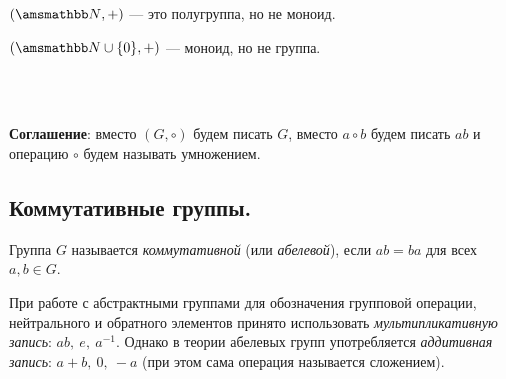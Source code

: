 \begin{example}
  $(\NN, +)$ --- это полугруппа, но не моноид.
  
  $(\NN \cup \{0\}, +)$ --- моноид, но не группа.
\end{example}
\\ \\
\begin{comment}
  \vspace{-0.3cm}
  \begin{enumerate}
    \item Ассоциативность довольно редкое свойство. \\
     Примеры неассоциативных бинарных операций:
     $M = \ZZ, a \circ b := a - b$ или 
     $M = \NN, a \circ b := a^b$.
    \item Нейтральный элемент в моноиде (и группе) единствен:
    если $e_1, e_2 \in M$ --- два нейтральных элемента, то
    $e_1 = e_1 \circ e_2 = e_2$.
    \item Обратный элемент в группе единствен:
    если $b_1, b_2$ --- два обратных к $a$ элемента, то
    \[
     b_1 = b_1 \circ e = b_1 \circ (a \circ b_2) =
     (b_1 \circ a) \circ b_2 = e \circ b_2 = b_2.
    \]
    Ввиду единственности обратный к $a$ элемент обозначается 
    символом $a^{-1}$.
    \item $(a \circ b)^{-1} = b^{-1} \circ a^{-1}$:
    \[
      (a \circ b) \circ (b^{-1} \circ a^{-1}) = 
      a \circ (b \circ b^{-1}) \circ a^{-1} = 
      a \circ e \circ a^{-1} = a \circ a^{-1} = e.
    \]
  \end{enumerate}
\end{comment}

\textbf{\textsf{Соглашение}}:
вместо $(G, \circ)$ будем писать $G$, 
вместо $a \circ b$ будем писать $ab$ и 
операцию $\circ$ будем называть умножением.

\subsection{Коммутативные группы.}
\vspace{0.2cm}
\begin{definition}
  Группа $G$ называется \textit{коммутативной}
  (или \textit{абелевой}), если $ab = ba$ для всех $a, b \in G$.
\end{definition}

При работе с абстрактными группами для обозначения 
групповой операции, нейтрального и обратного 
элементов принято использовать 
\textit{мультипликативную запись}: $ab,\ e,\ a^{-1}$.
Однако в теории абелевых групп употребляется 
\textit{аддитивная запись}: $a + b,\ 0,\ -a$
(при этом сама операция называется сложением).
 

